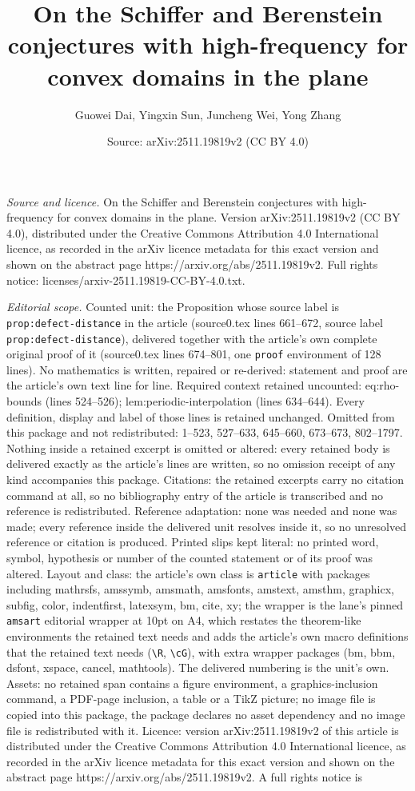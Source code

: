 \documentclass[10pt,a4paper]{amsart}
\title[On the Schiffer and Berenstein conjectures with high-frequen]{On the Schiffer and Berenstein conjectures with high-frequency for convex domains in the plane}
\author{Guowei Dai, Yingxin Sun, Juncheng Wei, Yong Zhang}
\date{Source: arXiv:2511.19819v2 (CC BY 4.0)}
\begin{document}
\maketitle

\noindent\emph{Source and licence.} On the Schiffer and Berenstein conjectures with high-frequency for convex domains in the plane. Version arXiv:2511.19819v2 (CC BY 4.0), distributed under the Creative Commons Attribution 4.0 International licence, as recorded in the arXiv licence metadata for this exact version and shown on the abstract page https://arxiv.org/abs/2511.19819v2. Full rights notice: licenses/arxiv-2511.19819-CC-BY-4.0.txt.\par\smallskip

\noindent\textit{Editorial scope.} Counted unit: the Proposition whose source label is \texttt{prop:defect-distance} in the article (source0.tex lines 661--672, source label \texttt{prop:defect-distance}), delivered together with the article's own complete original proof of it (source0.tex lines 674--801, one \texttt{proof} environment of 128 lines). No mathematics is written, repaired or re-derived: statement and proof are the article's own text line for line. Required context retained uncounted: eq:rho-bounds (lines 524--526); lem:periodic-interpolation (lines 634--644). Every definition, display and label of those lines is retained unchanged. Omitted from this package and not redistributed: 1--523, 527--633, 645--660, 673--673, 802--1797. Nothing inside a retained excerpt is omitted or altered: every retained body is delivered exactly as the article's lines are written, so no omission receipt of any kind accompanies this package. Citations: the retained excerpts carry no citation command at all, so no bibliography entry of the article is transcribed and no reference is redistributed. Reference adaptation: none was needed and none was made; every reference inside the delivered unit resolves inside it, so no unresolved reference or citation is produced. Printed slips kept literal: no printed word, symbol, hypothesis or number of the counted statement or of its proof was altered. Layout and class: the article's own class is \texttt{article} with packages including mathrsfs, amssymb, amsmath, amsfonts, amstext, amsthm, graphicx, subfig, color, indentfirst, latexsym, bm, cite, xy; the wrapper is the lane's pinned \texttt{amsart} editorial wrapper at 10pt on A4, which restates the theorem-like environments the retained text needs and adds the article's own macro definitions that the retained text needs (\texttt{\textbackslash R}, \texttt{\textbackslash cG}), with extra wrapper packages (bm, bbm, dsfont, xspace, cancel, mathtools). The delivered numbering is the unit's own. Assets: no retained span contains a figure environment, a graphics-inclusion command, a PDF-page inclusion, a table or a TikZ picture; no image file is copied into this package, the package declares no asset dependency and no image file is redistributed with it. Licence: version arXiv:2511.19819v2 of this article is distributed under the Creative Commons Attribution 4.0 International licence, as recorded in the arXiv licence metadata for this exact version and shown on the abstract page https://arxiv.org/abs/2511.19819v2. A full rights notice is 
\end{document}
